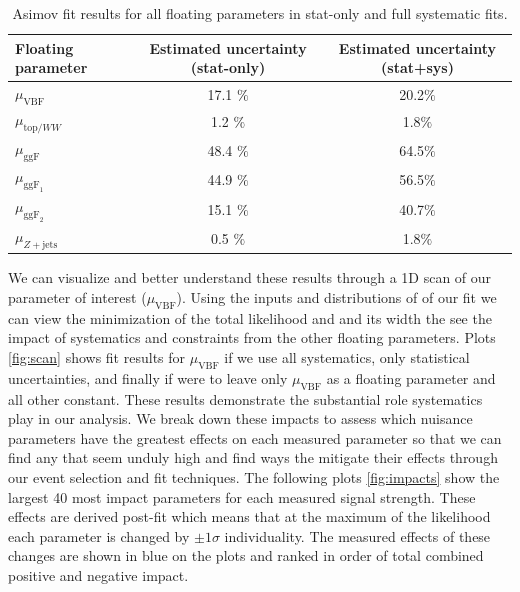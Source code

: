 \begin{table}[!h]
  \begin{center}
    \begin{tabular}{l|c|c|}
       Floating parameter & Estimated uncertainty (stat-only)    & Estimated uncertainty (stat+sys) \\
      \hline
       $\mu_{\text{VBF}}$ & 17.1 $\%$ & 20.2$\%$ \\
       $\mu_{\text{top/}WW}$ & 1.2 $\%$ & 1.8$\%$\\
       $\mu_{\text{ggF}}$ & 48.4 $\%$ & 64.5$\%$ \\
       $\mu_{\text{ggF}_1}$ & 44.9 $\%$ & 56.5$\%$ \\
       $\mu_{\text{ggF}_2}$ & 15.1 $\%$ & 40.7$\%$ \\
       $\mu_{Z+\text{jets}}$ & 0.5 $\%$ & 1.8$\%$ \\
    \end{tabular}
    \caption{Asimov fit results for all floating parameters in stat-only and full systematic fits.}
    \label{tab:muresults}
  \end{center}
\end{table}
We can visualize and better understand these results through a 1D scan of our parameter of interest ($\mu_{\text{VBF}}$). Using the inputs and distributions of of our fit we can view the minimization of the total likelihood and and its width the see the impact of systematics and constraints from the other floating parameters. Plots \ref{fig:scan} shows fit results for $\mu_{\text{VBF}}$ if we use all systematics, only statistical uncertainties, and finally if were to leave only $\mu_{\text{VBF}}$ as a floating parameter and all other constant. These results demonstrate the substantial role systematics play in our analysis. We break down these impacts to assess which nuisance parameters have the greatest effects on each measured parameter so that we can find any that seem unduly high and find ways the mitigate their effects through our event selection and fit techniques. The following plots \ref{fig:impacts} show the largest 40 most impact parameters for each measured signal strength. These effects are derived post-fit which means that at the maximum of the likelihood each parameter is changed by $\pm 1\sigma$ individuality. The measured effects of these changes are shown in blue on the plots and ranked in order of total combined positive and negative impact. 

